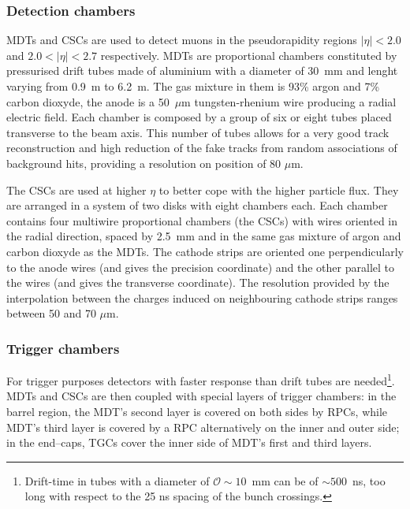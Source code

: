 \subsubsection{Detection chambers}

MDTs and CSCs are used to detect muons in the pseudorapidity regions $|\eta|<2.0$ and
$2.0<|\eta|<2.7$ respectively. MDTs are proportional chambers constituted by 
pressurised drift tubes made of aluminium with a diameter of 30~mm and lenght varying from 0.9~m to 6.2~m. 
The gas mixture in them is 93\% argon and 7\% carbon dioxyde, the anode is a 50~$\mu$m
tungsten-rhenium wire producing a radial electric field. Each chamber is composed by 
a group of six or eight tubes placed transverse to the beam axis. This number of tubes allows
for a very good track reconstruction and high reduction of the fake tracks from random 
associations of background hits, providing a resolution on position of 80 $\mu$m.


The CSCs are used at higher $\eta$ to better cope with the higher particle flux.
They are arranged in a system of two disks with eight chambers each. Each chamber
contains four multiwire proportional chambers (the CSCs) with wires oriented in the radial direction,
spaced by 2.5~mm and in the same gas mixture of argon and carbon dioxyde as the MDTs.
The cathode strips are oriented one perpendicularly to the anode wires (and gives the precision coordinate)
and the other parallel to the wires (and gives the transverse coordinate).
The resolution provided by the interpolation between the charges induced on neighbouring cathode strips
ranges between 50 and 70 $\mu$m.

\subsubsection{Trigger chambers}

For trigger purposes detectors with faster response than drift tubes are needed\footnote{Drift-time in tubes with a diameter of 
$\mathcal{O}\sim 10$~mm can be of $\sim500$~ns, too long with respect to the 25 ns spacing of the bunch crossings.}.
MDTs and CSCs are then coupled with special layers of trigger chambers: in the barrel region, the MDT's second layer
is covered on both sides by RPCs, while MDT's third layer is covered by a RPC alternatively on the inner and outer side;
in the end–caps, TGCs cover the inner side of MDT's first and third layers. 


